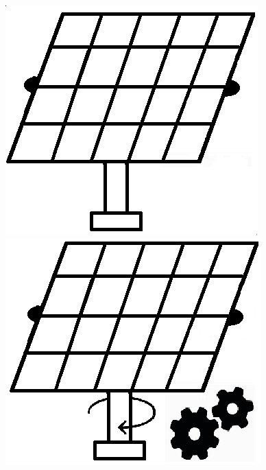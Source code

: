 \begin{figure}[H]
  \includegraphics[width=\textwidth]{pictures/k1.png}
\subcaption{\label{1}}
\endminipage
{}
  \includegraphics[width=\textwidth]{pictures/k2.png}
\subcaption{\label{2}}
\endminipage
{}

\end{figure}

